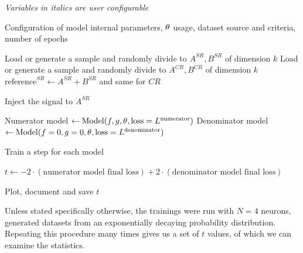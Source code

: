 \documentclass[../../ddppaper2.tex]{subfiles}
\begin{document}
\begin{algorithm}
\caption{Single $t$ value stochastic calculation}
\label{alg:single_train_algorithm}
\begin{algorithmic}[1]

\Statex \textit{Variables in italics are user configurable}
\Statex %

\Require Configuration of model internal parameters, ${\theta}$ usage, dataset source and criteria, number of epochs

\State Load or generate a sample and randomly divide to $A^{SR}, B^{SR}$ of dimension $\mathit{k}$
\State Load or generate a sample and randomly divide to $A^{CR}, B^{CR}$ of dimension $\mathit{k}$
\State $\text{reference}^{SR} \gets A^{SR} + B^{SR}$ and same for $CR$

    \State Inject the signal to $A^{SR}$
\EndIf

\State Numerator model $\gets \text{Model}(f, g, {\theta}, \text{loss} = L^{\text{numerator}})$
\State Denominator model $\gets \text{Model}(f = 0, g = 0, {\theta}, \text{loss} = L^{\text{denominator}})$

    \State Train a step for each model
\EndFor

\State $t \gets -2 \cdot (\text{numerator model final loss}) + 2 \cdot (\text{denominator model final loss})$

\State Plot, document and save
\State \Return $t$

\end{algorithmic}
\end{algorithm}

Unless stated specifically otherwise, the trainings were run with $N=4$ neurons, generated datasets from an exponentially decaying probability distribution.
Repeating this procedure many times gives us a set of $t$ values, of which we can examine the statistics.
\end{document}
